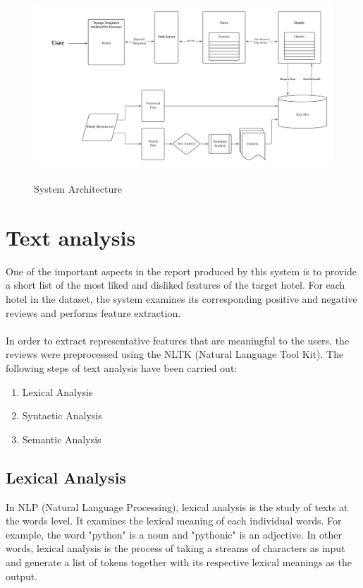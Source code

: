 \documentclass[a4paper]{report}
\begin{document}
\begin{figure}[h]
\includegraphics[width=\textwidth, height=7cm, keepaspectratio]{FYP_System Architecture.png}
\centering
\caption{System Architecture}
\label{figure:system_architecture}
\end{figure}

\section{Text analysis}
One of the important aspects in the report produced by this system is to provide a short list of the most liked and disliked features of the target hotel. For each hotel in the dataset, the system examines its corresponding positive and negative reviews and performs feature extraction.
\\\\
In order to extract representative features that are meaningful to the users, the reviews were preprocessed using the NLTK (Natural Language Tool Kit). The following steps of text analysis have been carried out:

\begin{enumerate}
  \item Lexical Analysis
  \item Syntactic Analysis
  \item Semantic Analysis
\end{enumerate}

\subsection{Lexical Analysis}
In NLP (Natural Language Processing), lexical analysis is the study of texts at the words level. It examines the lexical meaning of each individual words.  For example, the word "python" is a noun and "pythonic" is an adjective. In other words, lexical analysis is the process of taking a streams of characters as input and generate a list of tokens together with its respective lexical meanings as the output.
\end{document}
